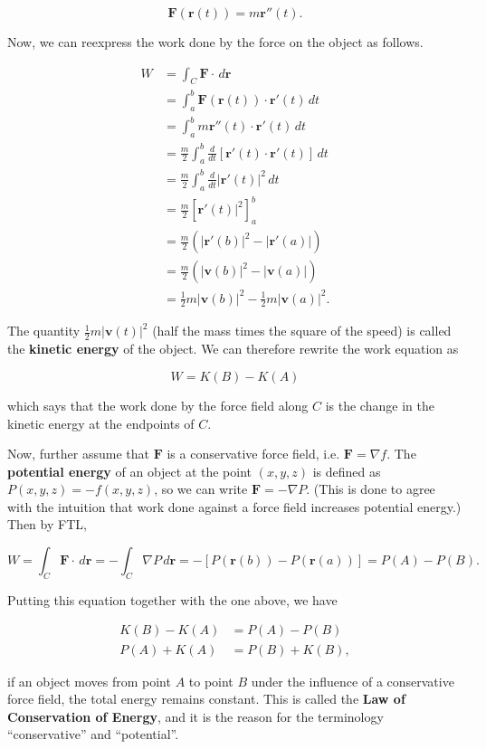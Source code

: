 \documentclass[11pt,oneside,english]{amsart}
\theoremstyle{definition}
\newcommand{\dd}[2]{\frac{d{#1}}{d{#2}}}
\begin{document}
\[
\mathbf{F}(\mathbf{r}(t))=m\mathbf{r}''(t).
\]

Now, we can reexpress the work done by the force on the object as follows.

\begin{align*}
W&=\int_C\mathbf{F}\cdot\,d\mathbf{r}\\[2mm]
&=\int_a^b\mathbf{F}(\mathbf{r}(t))\cdot\mathbf{r}'(t)\,dt\\[2mm]
&=\int_a^bm\mathbf{r}''(t)\cdot\mathbf{r}'(t)\,dt\\[2mm]
&=\frac{m}{2}\int_a^b\dd{}{t}[\mathbf{r}'(t)\cdot\mathbf{r}'(t)]\,dt\\[2mm]
&=\frac{m}{2}\int_a^b\dd{}{t}|\mathbf{r}'(t)|^2\,dt\\[2mm]
&=\frac{m}{2}\left[\mathbf{r}'(t)|^2\right]_a^b\\[2mm]
&=\frac{m}{2}\left(|\mathbf{r}'(b)|^2-|\mathbf{r}'(a)|\right)\\[2mm]
&=\frac{m}{2}\left(|\mathbf{v}(b)|^2-|\mathbf{v}(a)|\right)\\[2mm]
&=\frac{1}{2}m|\mathbf{v}(b)|^2-\frac{1}{2}m|\mathbf{v}(a)|^2.
\end{align*}

The quantity $\frac{1}{2}m|\mathbf{v}(t)|^2$ (half the mass times the square of the speed) is called the \textbf{kinetic energy} of the object. We can therefore rewrite the work equation as

\[
W=K(B)-K(A)
\]

which says that the work done by the force field along $C$ is the change in the kinetic energy at the endpoints of $C$.

Now, further assume that $\mathbf{F}$ is a conservative force field, i.e. $\mathbf{F}=\nabla f$. The \textbf{potential energy} of an object at the point $(x,y,z)$ is defined as $P(x,y,z)=-f(x,y,z)$, so we can write $\mathbf{F}=-\nabla P$. (This is done to agree with the intuition that work done against a force field increases potential energy.) Then by FTL,

\[
W=\int_C\mathbf{F}\cdot\,d\mathbf{r}=-\int_C\nabla P\,d\mathbf{r}=-[P(\mathbf{r}(b))-P(\mathbf{r}(a))]=P(A)-P(B).
\]

Putting this equation together with the one above, we have

\begin{align*}
K(B)-K(A)&=P(A)-P(B)\\
P(A)+K(A)&=P(B)+K(B),
\end{align*}

if an object moves from point $A$ to point $B$ under the influence of a conservative force field, the total energy remains constant. This is called the \textbf{Law of Conservation of Energy}, and it is the reason for the terminology ``conservative'' and ``potential''.
\end{document}
